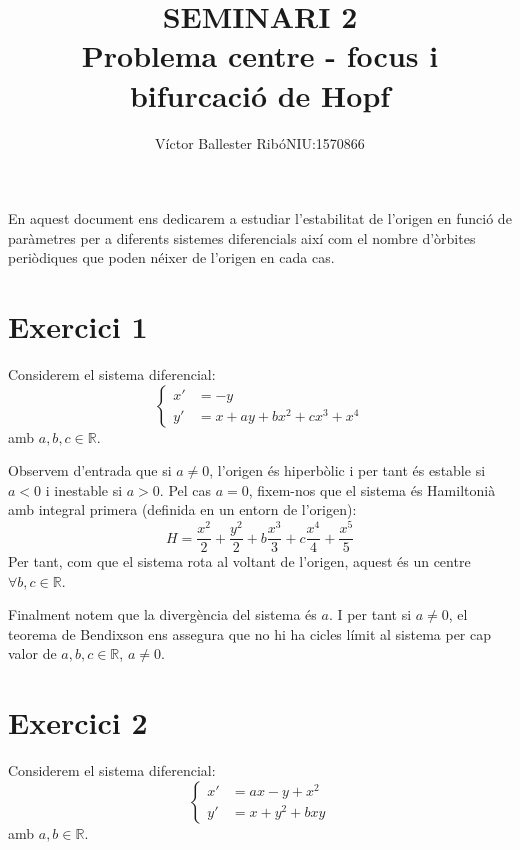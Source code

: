 \documentclass[a4paper]{article}
\title{\bfseries\large SEMINARI 2\\\vspace{0.25cm}Problema centre - focus i bifurcació de Hopf}
\author{Víctor Ballester Ribó\endgraf NIU:1570866}
\date{\parbox{\linewidth}{\centering
  Sistemes dinàmics\endgraf
  Grau en Matemàtiques\endgraf
  Universitat Autònoma de Barcelona\endgraf
  Gener de 2023}}
\newcommand{\RR}{\ensuremath{\mathbb{R}}} %
\theoremstyle{definition}
\begin{document}
\maketitle
En aquest document ens dedicarem a estudiar l'estabilitat de l'origen en funció de paràmetres per a diferents sistemes diferencials així com el nombre d'òrbites periòdiques que poden néixer de l'origen en cada cas.
\section*{Exercici 1}
Considerem el sistema diferencial:
\begin{equation}\label{sis1}
  \left\{
  \begin{aligned}
    x' & =-y                    \\
    y' & =x + ay +bx^2+cx^3+x^4
  \end{aligned}
  \right.
\end{equation}
amb $a,b,c\in\RR$.

Observem d'entrada que si $a\ne 0$, l'origen és hiperbòlic i per tant és estable si $a<0$ i inestable si $a>0$. Pel cas $a=0$, fixem-nos que el sistema és Hamiltonià amb integral primera (definida en un entorn de l'origen): $$H=\frac{x^2}{2}+\frac{y^2}{2}+b\frac{x^3}{3}+c\frac{x^4}{4}+\frac{x^5}{5}$$
Per tant, com que el sistema rota al voltant de l'origen, aquest és un centre $\forall b,c \in\RR$.

Finalment notem que la divergència del sistema és $a$. I per tant si $a\ne 0$, el teorema de Bendixson ens assegura que no hi ha cicles límit al sistema per cap valor de $a,b,c\in\RR$, $a\ne 0$.
\section*{Exercici 2}
Considerem el sistema diferencial:
\begin{equation}\label{sis2}
  \left\{
  \begin{aligned}
    x' & =ax-y+x^2     \\
    y' & =x + y^2+b xy
  \end{aligned}
  \right.
\end{equation}
amb $a,b\in\RR$.
\end{document}
